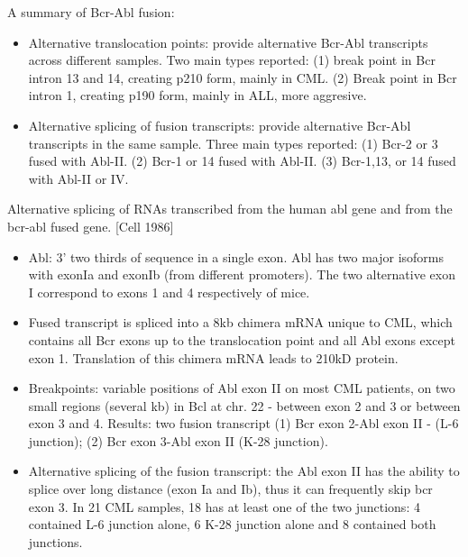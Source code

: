 \documentclass{report}
\begin{document}
A summary of Bcr-Abl fusion: 
\begin{itemize}
	\item Alternative translocation points: provide alternative Bcr-Abl transcripts across different samples. Two main types reported: (1) break point in Bcr intron 13 and 14, creating p210 form, mainly in CML. (2) Break point in Bcr intron 1, creating p190 form, mainly in ALL, more aggresive. 
	
	\item Alternative splicing of fusion transcripts: provide alternative Bcr-Abl transcripts in the same sample. Three main types reported: (1) Bcr-2 or 3 fused with Abl-II. (2) Bcr-1 or 14 fused with Abl-II. (3) Bcr-1,13, or 14 fused with Abl-II or IV. 
\end{itemize}

Alternative splicing of RNAs transcribed from the human abl gene and from the bcr-abl fused gene. [Cell 1986]
\begin{itemize}
	\item Abl: 3' two thirds of sequence in a single exon. Abl has two major isoforms with exonIa and exonIb (from different promoters). The two alternative exon I correspond to exons 1 and 4 respectively of mice. 
	
	\item Fused transcript is spliced into a 8kb chimera mRNA unique to CML, which contains all Bcr exons up to the translocation point and all Abl exons except exon 1. Translation of this chimera mRNA leads to 210kD protein. 
	
	\item Breakpoints: variable positions of Abl exon II on most CML patients, on two small regions (several kb) in Bcl at chr. 22 - between exon 2 and 3 or between exon 3 and 4. Results: two fusion transcript (1) Bcr exon 2-Abl exon II - (L-6 junction); (2) Bcr exon 3-Abl exon II (K-28 junction). 
	
	\item Alternative splicing of the fusion transcript: the Abl exon II has the ability to splice over long distance (exon Ia and Ib), thus it can frequently skip bcr exon 3. In 21 CML samples, 18 has at least one of the two junctions: 4 contained L-6 junction alone, 6 K-28 junction alone and 8 contained both junctions. 
\end{itemize}
\end{document}
